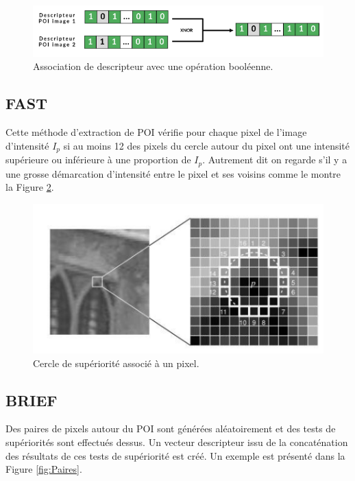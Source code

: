 \documentclass[11pt]{article}
\begin{document}
      \begin{figure}[hbt]  
        \includegraphics[width=\textwidth]{CalculsDescripteurs.png}    
        \caption{Association de descripteur avec une opération booléenne.}
        \label{fig:Descripteur}
      \end{figure} 

    \subsection*{FAST}
      Cette méthode d'extraction de POI vérifie pour chaque pixel de l'image d'intensité $I_p$ si au moins 12 des pixels
      du cercle autour du pixel ont une intensité supérieure ou inférieure à une proportion de $I_p$. Autrement dit on regarde s’il y a une 
      grosse démarcation d'intensité entre le pixel et ses voisins comme le montre la Figure \ref{fig:CercleSuperiorite}.

      \begin{figure}[hbt]  
        \includegraphics[width=\textwidth]{CercleSuperiorite.png}    
        \caption{Cercle de supériorité associé à un pixel.}
        \label{fig:CercleSuperiorite}
      \end{figure}

    \subsection*{BRIEF}
      Des paires de pixels autour du POI sont générées aléatoirement et des tests de supériorités sont effectués dessus. 
      Un vecteur descripteur issu de la concaténation des résultats de ces tests de supériorité est créé. Un exemple est présenté 
      dans la Figure \ref{fig:Paires}.
\end{document}

